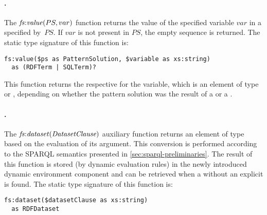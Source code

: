 \paragraph{.}
\label{sec:fs:value}
%
The $\mathit{fs{:}value}\!\left(PS, var\right)$ function returns the value of the specified variable $var$ in a
 specified by~$PS$.  If $var$ is not present in $PS$, the empty sequence is returned. 
%
The static type signature of this function is:
%
{\small
\begin{verbatim}
fs:value($ps as PatternSolution, $variable as xs:string)
  as (RDFTerm | SQLTerm)?
\end{verbatim}
}%
%
\noindent This function returns the respective  for the variable, which is an element of type
 or , depending on whether the pattern solution was the result of a \SQLForClause or a
\SparqlForClause.


\paragraph{.}
\label{sec:fs:dataset}
%
The $\mathit{fs{:}dataset}\!\left({\textit{Da\-ta\-set\-Clau\-se}}\right)$ auxiliary function returns an element of type  based on
the evaluation of its argument.  
%
This conversion is performed according to the SPARQL semantics presented in \cref{sec:sparql-preliminaries}.  The result
of this function is stored (by dynamic evaluation rules) in the newly introduced  dynamic
environment component and can be retrieved when a \SparqlForClause without an explicit \DatasetClause is found.
%
The static type signature of this function is:
%
\begin{center}
\begin{minipage}{0.9\linewidth}
{\small\centering
\begin{verbatim}
fs:dataset($datasetClause as xs:string)
  as RDFDataset
\end{verbatim}
}
\end{minipage}
\end{center}
%

